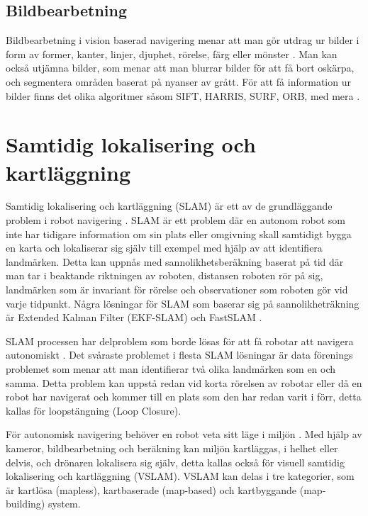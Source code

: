 \section{Bildbearbetning}

Bildbearbetning i vision baserad navigering menar att man gör utdrag ur bilder i form av former, kanter, linjer, djuphet, rörelse, färg eller mönster \citep{982903}. Man kan också utjämna bilder, som menar att man blurrar bilder för att få bort oskärpa, och segmentera områden baserat på nyanser av grått. För att få information ur bilder finns det olika algoritmer såsom SIFT, HARRIS, SURF, ORB, med mera \citep{8930783, slamproblem, mapbuildingsift}.

\chapter{Samtidig lokalisering och kartläggning}

Samtidig lokalisering och kartläggning (SLAM) är ett av de grundläggande problem i robot navigering \citep{realslamproblem}. SLAM är ett problem där en autonom robot som inte har tidigare information om sin plats eller omgivning skall samtidigt bygga en karta och lokaliserar sig själv till exempel med hjälp av att identifiera landmärken. Detta kan uppnås med sannolikhetsberäkning baserat på tid där man tar i beaktande riktningen av roboten, distansen roboten rör på sig, landmärken som är invariant för rörelse och observationer som roboten gör vid varje tidpunkt. Några lösningar för SLAM som baserar sig på sannolikheträkning är Extended Kalman Filter (EKF-SLAM) och FastSLAM \citep{realslamproblem}. 

SLAM processen har delproblem som borde lösas för att få robotar att navigera autonomiskt \citep{slamproblem}. Det svåraste problemet i flesta SLAM lösningar är data förenings problemet som menar att man identifierar två olika landmärken som en och samma. Detta problem kan uppstå redan vid korta rörelsen av robotar eller då en robot har navigerat och kommer till en plats som den har redan varit i förr, detta kallas för loopstängning (Loop Closure). 

För autonomisk navigering behöver en robot veta sitt läge i miljön \citep{geospatial}. Med hjälp av kameror, bildbearbetning och beräkning kan miljön kartläggas, i helhet eller delvis, och drönaren lokalisera sig själv, detta kallas också för visuell samtidig lokalisering och kartläggning (VSLAM). VSLAM kan delas i tre kategorier, som är kartlösa (mapless), kartbaserade (map-based) och kartbyggande (map-building) system. 

